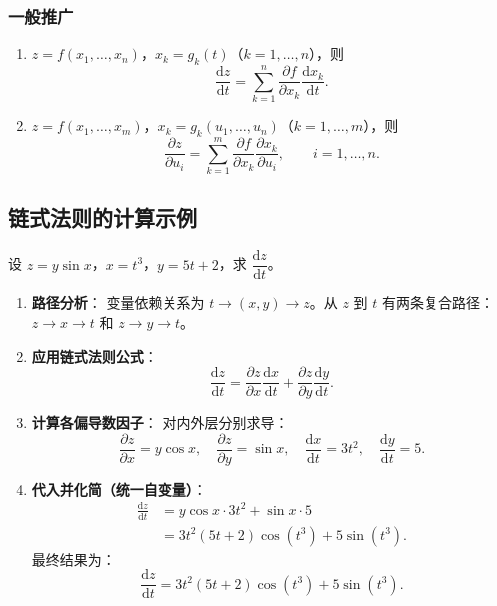 \documentclass[lang=cn,11pt]{elegantbook}
\begin{document}
\subsubsection*{一般推广}

\begin{property}[链式法则的一般形式] \label{prop:chain-general}
\begin{enumerate}
  \item[\textbf{情形一}] $z=f(x_1,\dots,x_n)$，$x_k=g_k(t)$（$k=1,\dots,n$），则
        \[
        \frac{\mathrm{d}z}{\mathrm{d}t}=\sum_{k=1}^{n}\frac{\partial f}{\partial x_k}\frac{\mathrm{d}x_k}{\mathrm{d}t}.
        \]
  \item[\textbf{情形二}] $z=f(x_1,\dots,x_m)$，$x_k=g_k(u_1,\dots,u_n)$（$k=1,\dots,m$），则
        \[
        \frac{\partial z}{\partial u_i}=\sum_{k=1}^{m}\frac{\partial f}{\partial x_k}\frac{\partial x_k}{\partial u_i},
        \qquad i=1,\dots,n.
        \]
\end{enumerate}
\end{property}


\subsection{链式法则的计算示例}

\begin{exercise} \label{ex:chain-1var}
设 $z=y\sin x$，$x=t^3$，$y=5t+2$，求 $\dfrac{\mathrm{d}z}{\mathrm{d}t}$。
\end{exercise}

\begin{solution}
\begin{enumerate}
  \item \textbf{路径分析}：
  变量依赖关系为 $t\to(x,y)\to z$。从 $z$ 到 $t$ 有两条复合路径：$z\to x\to t$ 和 $z\to y\to t$。

  \item \textbf{应用链式法则公式}：
  \[
  \frac{\mathrm{d}z}{\mathrm{d}t}=\frac{\partial z}{\partial x}\frac{\mathrm{d}x}{\mathrm{d}t}
              +\frac{\partial z}{\partial y}\frac{\mathrm{d}y}{\mathrm{d}t}.
  \]

  \item \textbf{计算各偏导数因子}：
  对内外层分别求导：
  \[
  \frac{\partial z}{\partial x}=y\cos x,\quad
  \frac{\partial z}{\partial y}=\sin x,\quad
  \frac{\mathrm{d}x}{\mathrm{d}t}=3t^2,\quad
  \frac{\mathrm{d}y}{\mathrm{d}t}=5.
  \]

  \item \textbf{代入并化简（统一自变量）}：
  \begin{align*}
  \frac{\mathrm{d}z}{\mathrm{d}t}
  &=y\cos x\cdot 3t^2+\sin x\cdot 5\\
  &=3t^2(5t+2)\cos(t^3)+5\sin(t^3).
  \end{align*}
  最终结果为：
  \[
  \boxed{\frac{\mathrm{d}z}{\mathrm{d}t}=3t^2(5t+2)\cos(t^3)+5\sin(t^3)}.
  \]
\end{enumerate}
\end{solution}
\end{document}
